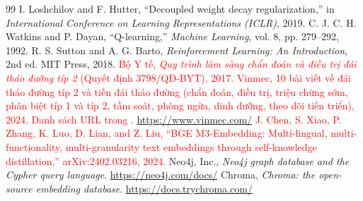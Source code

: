 \documentclass[12pt,a4paper]{report}
\newcommand{\code}[1]{{\small\path{#1}}}
\newcommand{\capnhat}[1]{\textcolor{red}{#1}}
\begin{document}
\begin{thebibliography}{99}
 I. Loshchilov and F. Hutter, ``Decoupled weight decay regularization,'' in \emph{International Conference on Learning Representations (ICLR)}, 2019.
 C. J. C. H. Watkins and P. Dayan, ``Q-learning,'' \emph{Machine Learning}, vol. 8, pp. 279--292, 1992.
 R. S. Sutton and A. G. Barto, \emph{Reinforcement Learning: An Introduction}, 2nd ed. MIT Press, 2018.
 \capnhat{Bộ Y tế, \emph{Quy trình lâm sàng chẩn đoán và điều trị đái tháo đường típ 2} (Quyết định 3798/QĐ-BYT), 2017.}
 \capnhat{Vinmec, 10 bài viết về đái tháo đường típ 2 và tiền đái tháo đường (chẩn đoán, điều trị, triệu chứng sớm, phân biệt típ 1 và típ 2, tầm soát, phòng ngừa, dinh dưỡng, theo dõi tiến triển), 2024. Danh sách URL trong \code{data/corpus/sources.json}. \url{https://www.vinmec.com/}}
 \capnhat{J. Chen, S. Xiao, P. Zhang, K. Luo, D. Lian, and Z. Liu, ``BGE M3-Embedding: Multi-lingual, multi-functionality, multi-granularity text embeddings through self-knowledge distillation,'' arXiv:2402.03216, 2024.}
 Neo4j, Inc., \emph{Neo4j graph database and the Cypher query language}. \url{https://neo4j.com/docs/}
 Chroma, \emph{Chroma: the open-source embedding database}. \url{https://docs.trychroma.com/}
\end{thebibliography}
\end{document}
